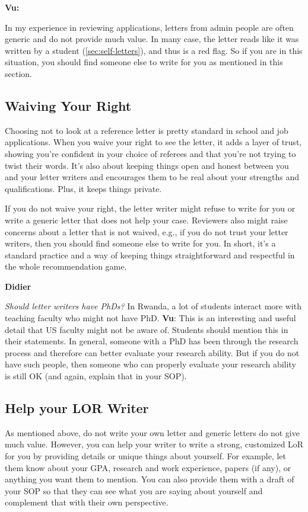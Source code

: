 \documentclass[oneside,11pt,dvipsnames]{book}
\newenvironment{commentbox}[1][]{
  \small
  \begin{mybox}
    {\small \textbf{#1}}
  }{
  \end{mybox}
}
\begin{document}
\begin{commentbox}[Vu:]
  In my experience in reviewing applications, letters from admin people are often generic and do not provide much value. 
  In many case, the letter reads like it was written by a student (\autoref{sec:self-letters}), and thus is a red flag.  So if you are in this situation, you should find someone else to write for you as mentioned in this section.
\end{commentbox}




\subsection{Waiving Your Right}  Choosing not to look at a reference letter is pretty standard in school and job applications. When you waive your right to see the letter, it adds a layer of trust, showing you're confident in your choice of referees and that you're not trying to twist their words. It's also about keeping things open and honest between you and your letter writers and encourages them to be real about your strengths and qualifications. Plus, it keeps things private.

If you do not waive your right,  the letter writer might refuse to write for you or write a generic letter that does not help your case.  Reviewers also might raise concerns about a letter that is not waived, e.g., if you do not trust your letter writers, then you should find someone else to write for you. In short, it's a standard practice and a way of keeping things straightforward and respectful in the whole recommendation game.

\begin{commentbox}[Didier]
  \emph{Should letter writers have PhDs?}  In Rwanda, a lot of students interact more with teaching faculty who might not have PhD.
  \tcblower
  \textbf{Vu}: This is an interesting and useful detail that US faculty might not be aware of. Students should mention this in their statements. In general, someone with a PhD has been through the research process and therefore can better evaluate your research ability.  But if you do not have such people, then someone who can properly evaluate your research ability is still OK (and again, explain that in your SOP).
\end{commentbox}


\subsection{Help your LOR Writer} As mentioned above, do not write your own letter and generic letters do not give much value. However, you can help your writer to write a strong, customized LoR for you by providing details or unique things about yourself. For example, let them know about your GPA, research and work experience, papers (if any), or anything you want them to mention. You can also provide them with a draft of your SOP so that they can see what you are saying about yourself and complement that with their own perspective.
\end{document}
